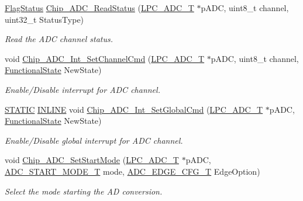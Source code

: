 \begin{DoxyCompactItemize}
\hyperlink{group___l_p_c___types___public___types_ga89136caac2e14c55151f527ac02daaff}{Flag\+Status} \hyperlink{group___a_d_c__18_x_x__43_x_x_ga182ae98a23007564b3eaeb61a31ac553}{Chip\+\_\+\+A\+D\+C\+\_\+\+Read\+Status} (\hyperlink{struct_l_p_c___a_d_c___t}{L\+P\+C\+\_\+\+A\+D\+C\+\_\+T} $\ast$p\+A\+DC, uint8\+\_\+t channel, uint32\+\_\+t Status\+Type)
\begin{DoxyCompactList}\small\item\em Read the A\+DC channel status. \end{DoxyCompactList}\item 
void \hyperlink{group___a_d_c__18_x_x__43_x_x_gac0bf9a8d016bcd88866d4ae59b1ca78c}{Chip\+\_\+\+A\+D\+C\+\_\+\+Int\+\_\+\+Set\+Channel\+Cmd} (\hyperlink{struct_l_p_c___a_d_c___t}{L\+P\+C\+\_\+\+A\+D\+C\+\_\+T} $\ast$p\+A\+DC, uint8\+\_\+t channel, \hyperlink{group___l_p_c___types___public___types_gac9a7e9a35d2513ec15c3b537aaa4fba1}{Functional\+State} New\+State)
\begin{DoxyCompactList}\small\item\em Enable/\+Disable interrupt for A\+DC channel. \end{DoxyCompactList}\item 
\hyperlink{group___l_p_c___types___public___macros_ga10b2d890d871e1489bb02b7e70d9bdfb}{S\+T\+A\+T\+IC} \hyperlink{spifi__18xx__43xx_8h_a2eb6f9e0395b47b8d5e3eeae4fe0c116}{I\+N\+L\+I\+NE} void \hyperlink{group___a_d_c__18_x_x__43_x_x_gafa58ed3d91229dfcc78a5fc05dd4221b}{Chip\+\_\+\+A\+D\+C\+\_\+\+Int\+\_\+\+Set\+Global\+Cmd} (\hyperlink{struct_l_p_c___a_d_c___t}{L\+P\+C\+\_\+\+A\+D\+C\+\_\+T} $\ast$p\+A\+DC, \hyperlink{group___l_p_c___types___public___types_gac9a7e9a35d2513ec15c3b537aaa4fba1}{Functional\+State} New\+State)
\begin{DoxyCompactList}\small\item\em Enable/\+Disable global interrupt for A\+DC channel. \end{DoxyCompactList}\item 
void \hyperlink{group___a_d_c__18_x_x__43_x_x_ga951b5b680e4d3be64c83fc6e1caf644d}{Chip\+\_\+\+A\+D\+C\+\_\+\+Set\+Start\+Mode} (\hyperlink{struct_l_p_c___a_d_c___t}{L\+P\+C\+\_\+\+A\+D\+C\+\_\+T} $\ast$p\+A\+DC, \hyperlink{group___a_d_c__18_x_x__43_x_x_ga68aae5a89b4dabc910e457a00e57ea8c}{A\+D\+C\+\_\+\+S\+T\+A\+R\+T\+\_\+\+M\+O\+D\+E\+\_\+T} mode, \hyperlink{group___a_d_c__18_x_x__43_x_x_ga18d12879b004e16af3b47467a2d81d56}{A\+D\+C\+\_\+\+E\+D\+G\+E\+\_\+\+C\+F\+G\+\_\+T} Edge\+Option)
\begin{DoxyCompactList}\small\item\em Select the mode starting the AD conversion. \end{DoxyCompactList}\item 

\end{DoxyCompactItemize}
